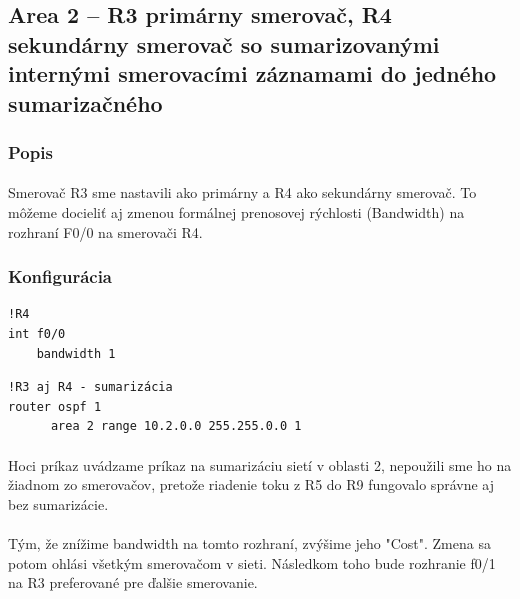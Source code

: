 \documentclass[12pt,twoside,a4paper]{report}
\begin{document}
\subsection{Area 2 – R3 primárny smerovač, R4 sekundárny smerovač so sumarizovanými internými smerovacími záznamami do jedného sumarizačného}
\subsubsection{Popis}
\paragraph{}
Smerovač R3 sme nastavili ako primárny a R4 ako sekundárny smerovač. To môžeme docieliť aj zmenou formálnej prenosovej rýchlosti (Bandwidth) na rozhraní F0/0 na smerovači R4.

\subsubsection{Konfigurácia}
\noindent
{\selectfont
\begin{small}
\begin{verbatim}
!R4
int f0/0
    bandwidth 1

\end{verbatim}
\end{small}
}

\noindent
{\selectfont
\begin{small}
\begin{verbatim}
!R3 aj R4 - sumarizácia
router ospf 1
      area 2 range 10.2.0.0 255.255.0.0 1

\end{verbatim}
\end{small}
}

\paragraph{}
Hoci príkaz uvádzame príkaz na sumarizáciu sietí v oblasti 2, nepoužili sme ho na žiadnom zo smerovačov, pretože riadenie toku z R5 do R9 fungovalo správne aj bez sumarizácie.

\paragraph{}
Tým, že znížime bandwidth na tomto rozhraní, zvýšime jeho "Cost". Zmena sa potom ohlási všetkým smerovačom v sieti. Následkom toho bude rozhranie f0/1 na R3 preferované pre ďalšie smerovanie.
\end{document}
